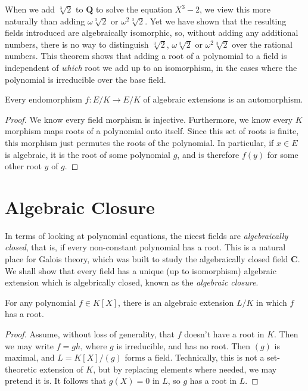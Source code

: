 When we add $\sqrt[3]{2}$ to $\mathbf{Q}$ to solve the equation $X^3 - 2$, we view this more naturally than adding $\omega \sqrt[3]{2}$ or $\omega^2 \sqrt[3]{2}$. Yet we have shown that the resulting fields introduced are algebraically isomorphic, so, without adding any additional numbers, there is no way to distinguish $\sqrt[3]{2}$, $\omega \sqrt[3]{2}$ or $\omega^2 \sqrt[3]{2}$ over the rational numbers. This theorem shows that adding a root of a polynomial to a field is independent of {\it which} root we add up to an isomorphism, in the cases where the polynomial is irreducible over the base field.

\begin{corollary}
    Every endomorphism $f: E/K \to E/K$ of algebraic extensions is an automorphism.
\end{corollary}
\begin{proof}
	We know every field morphism is injective. Furthermore, we know every $K$ morphism maps roots of a polynomial onto itself. Since this set of roots is finite, this morphism just permutes the roots of the polynomial. In particular, if $x \in E$ is algebraic, it is the root of some polynomial $g$, and is therefore $f(y)$ for some other root $y$ of $g$.
\end{proof}

\section{Algebraic Closure}

In terms of looking at polynomial equations, the nicest fields are {\it algebraically closed}, that is, if every non-constant polynomial has a root. This is a natural place for Galois theory, which was built to study the algebraically closed field $\mathbf{C}$. We shall show that every field has a unique (up to isomorphism) algebraic extension which is algebrically closed, known as the {\it algebraic closure}.

\begin{lemma}
    For any polynomial $f \in K[X]$, there is an algebraic extension $L/K$ in which $f$ has a root.
\end{lemma}
\begin{proof}
    Assume, without loss of generality, that $f$ doesn't have a root in $K$. Then we may write $f = gh$, where $g$ is irreducible, and has no root. Then $(g)$ is maximal, and $L = K[X]/(g)$ forms a field. Technically, this is not a set-theoretic extension of $K$, but by replacing elements where needed, we may pretend it is. It follows that $g(X) = 0$ in $L$, so $g$ has a root in $L$.
\end{proof}

